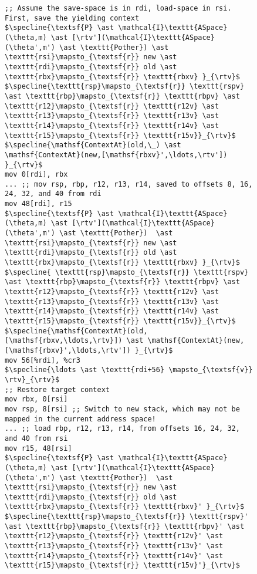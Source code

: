 \begin{figure}\footnotesize
\begin{lstlisting}[mathescape]
;; Assume the save-space is in rdi, load-space in rsi. First, save the yielding context
$\specline{\textsf{P} \ast \mathcal{I}\texttt{ASpace}(\theta,m) \ast [\rtv'](\mathcal{I}\texttt{ASpace}(\theta',m') \ast \texttt{Pother}) \ast \texttt{rsi}\mapsto_{\textsf{r}} new \ast \texttt{rdi}\mapsto_{\textsf{r}} old \ast \texttt{rbx}\mapsto_{\textsf{r}} \texttt{rbxv} }_{\rtv}$
$\specline{\texttt{rsp}\mapsto_{\textsf{r}} \texttt{rspv} \ast \texttt{rbp}\mapsto_{\textsf{r}} \texttt{rbpv} \ast \texttt{r12}\mapsto_{\textsf{r}} \texttt{r12v} \ast \texttt{r13}\mapsto_{\textsf{r}} \texttt{r13v} \ast \texttt{r14}\mapsto_{\textsf{r}} \texttt{r14v} \ast \texttt{r15}\mapsto_{\textsf{r}} \texttt{r15v}}_{\rtv}$
$\specline{\mathsf{ContextAt}(old,\_) \ast \mathsf{ContextAt}(new,[\mathsf{rbxv}',\ldots,\rtv']) }_{\rtv}$
mov 0[rdi], rbx
... ;; mov rsp, rbp, r12, r13, r14, saved to offsets 8, 16, 24, 32, and 40 from rdi
mov 48[rdi], r15
$\specline{\textsf{P} \ast \mathcal{I}\texttt{ASpace}(\theta,m) \ast [\rtv'](\mathcal{I}\texttt{ASpace}(\theta',m') \ast \texttt{Pother})  \ast  \texttt{rsi}\mapsto_{\textsf{r}} new \ast \texttt{rdi}\mapsto_{\textsf{r}} old \ast \texttt{rbx}\mapsto_{\textsf{r}} \texttt{rbxv} }_{\rtv}$
$\specline{ \texttt{rsp}\mapsto_{\textsf{r}} \texttt{rspv} \ast \texttt{rbp}\mapsto_{\textsf{r}} \texttt{rbpv} \ast \texttt{r12}\mapsto_{\textsf{r}} \texttt{r12v} \ast \texttt{r13}\mapsto_{\textsf{r}} \texttt{r13v} \ast \texttt{r14}\mapsto_{\textsf{r}} \texttt{r14v} \ast \texttt{r15}\mapsto_{\textsf{r}} \texttt{r15v}}_{\rtv}$
$\specline{\mathsf{ContextAt}(old,[\mathsf{rbxv,\ldots,\rtv}]) \ast \mathsf{ContextAt}(new,[\mathsf{rbxv}',\ldots,\rtv']) }_{\rtv}$
mov 56[%rdi], %cr3
$\specline{\ldots \ast \texttt{rdi+56} \mapsto_{\textsf{v}} \rtv}_{\rtv}$    
;; Restore target context
mov rbx, 0[rsi] 
mov rsp, 8[rsi] ;; Switch to new stack, which may not be mapped in the current address space!
... ;; load rbp, r12, r13, r14, from offsets 16, 24, 32, and 40 from rsi
mov r15, 48[rsi]
$\specline{\textsf{P} \ast \mathcal{I}\texttt{ASpace}(\theta,m) \ast [\rtv'](\mathcal{I}\texttt{ASpace}(\theta',m') \ast \texttt{Pother})  \ast  \texttt{rsi}\mapsto_{\textsf{r}} new \ast \texttt{rdi}\mapsto_{\textsf{r}} old \ast \texttt{rbx}\mapsto_{\textsf{r}} \texttt{rbxv}' }_{\rtv}$
$\specline{\texttt{rsp}\mapsto_{\textsf{r}} \texttt{rspv}' \ast \texttt{rbp}\mapsto_{\textsf{r}} \texttt{rbpv}' \ast \texttt{r12}\mapsto_{\textsf{r}} \texttt{r12v}' \ast \texttt{r13}\mapsto_{\textsf{r}} \texttt{r13v}' \ast \texttt{r14}\mapsto_{\textsf{r}} \texttt{r14v}' \ast \texttt{r15}\mapsto_{\textsf{r}} \texttt{r15v}'}_{\rtv}$

\end{lstlisting}
\end{figure}
